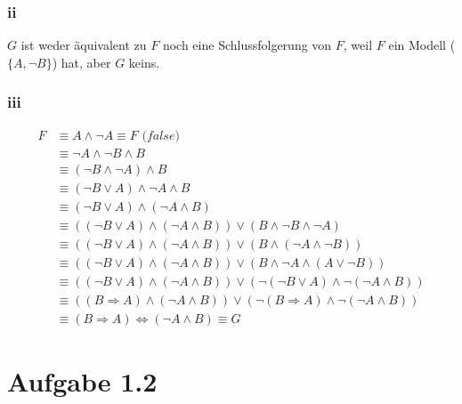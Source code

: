 \documentclass[10pt,a4paper]{article}
\begin{document}
\subsubsection{ii}

$G$ ist weder äquivalent zu $F$ noch eine Schlussfolgerung von $F$, weil $F$ ein Modell ($\{A, \neg B\}$) hat, aber $G$ keins.

\subsubsection{iii}

\begin{align*}
  F & \equiv A \land \neg A \equiv F \textit{ (false)}\\
  & \equiv \neg A \land \neg B \land B\\
  & \equiv (\neg B \land \neg A) \land B\\
  & \equiv (\neg B \lor A) \land \neg A \land B\\
  & \equiv (\neg B \lor A) \land (\neg A \land B)\\
  & \equiv ((\neg B \lor A) \land (\neg A \land B)) \lor (B \land \neg B \land \neg A)\\
  & \equiv ((\neg B \lor A) \land (\neg A \land B)) \lor (B \land (\neg A \land \neg B))\\
  & \equiv ((\neg B \lor A) \land (\neg A \land B)) \lor (B \land \neg A \land (A \lor \neg B))\\
  & \equiv ((\neg B \lor A) \land (\neg A \land B)) \lor (\neg (\neg B \lor A) \land \neg (\neg A \land B))\\
  & \equiv ((B \Rightarrow A) \land (\neg A \land B)) \lor (\neg (B \Rightarrow A) \land \neg (\neg A \land B))\\
  & \equiv (B \Rightarrow A) \Leftrightarrow (\neg A \land B) \equiv G
\end{align*}

\section{Aufgabe 1.2}
\end{document}
